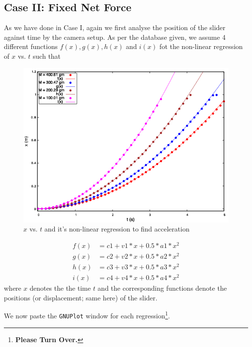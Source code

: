 \documentclass[11pt, a4paper, abstract=true]{scrartcl}
\begin{document}
\subsection{Case II: Fixed Net Force}
As we have done in Case I, again we first analyse the position of the slider against time by the camera setup. As per the database given, we assume 4 different functions \(f(x), g(x), h(x)\) and \(i(x)\) fot the non-linear regression of \(x\) vs. \(t\) such that
\begin{figure}[h]
    \centering
    \includegraphics[scale=0.65]{assets/xt_fixed_force.png}
    \caption{\(x\) vs. \(t\) and it's non-linear regression to find acceleration}
    \label{fig:fig7}
\end{figure}
\begin{algorithm}
    \begin{align*}
        f(x) &= c1 + v1 * x + 0.5 * a1 * x^2 \\
        g(x) &= c2 + v2 * x + 0.5 * a2 * x^2 \\
        h(x) &= c3 + v3 * x + 0.5 * a3 * x^2 \\
        i(x) &= c4 + v4 * x + 0.5 * a4 * x^2
    \end{align*}
    where \(x\) denotes the the time \(t\) and the corresponding functions denote the positions (or displacement; same here) of the slider.
\end{algorithm}
We now paste the \texttt{GNUPlot} window for each regression\footnote{\textbf{Please Turn Over.}}.

\newpage
\end{document}
